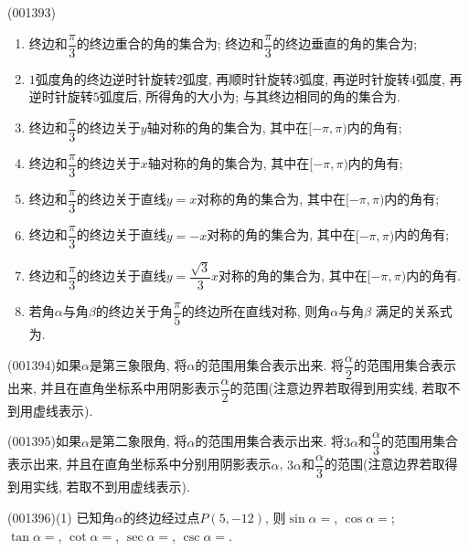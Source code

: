 \item (001393)\begin{enumerate}[(1)]
\item 终边和$\dfrac{\pi}{3}$的终边重合的角的集合为; 终边和$\dfrac{\pi}{3}$的终边垂直的角的集合为;\\ 
\item $1$弧度角的终边逆时针旋转$2$弧度, 再顺时针旋转$3$弧度, 再逆时针旋转$4$弧度, 再逆时针旋转$5$弧度后, 所得角的大小为; 与其终边相同的角的集合为.\\ 
\item 终边和$\dfrac{\pi}{3}$的终边关于$y$轴对称的角的集合为, 其中在$[-\pi,\pi)$内的角有;\\ 
\item 终边和$\dfrac{\pi}{3}$的终边关于$x$轴对称的角的集合为, 其中在$[-\pi,\pi)$内的角有;\\ 
\item 终边和$\dfrac{\pi}{3}$的终边关于直线$y=x$对称的角的集合为, 其中在$[-\pi,\pi)$内的角有;\\ 
\item 终边和$\dfrac{\pi}{3}$的终边关于直线$y=-x$对称的角的集合为, 其中在$[-\pi,\pi)$内的角有;\\ 
\item 终边和$\dfrac{\pi}{3}$的终边关于直线$y=\dfrac{\sqrt{3}}{3}x$对称的角的集合为, 其中在$[-\pi,\pi)$内的角有.\\ 
\item 若角$\alpha$与角$\beta$的终边关于角$\dfrac{\pi}{5}$的终边所在直线对称, 则角$\alpha$与角$\beta$ 满足的关系式为.\\ 
\end{enumerate}
\item (001394)如果$\alpha$是第三象限角, 将$\alpha$的范围用集合表示出来. 将$\dfrac{\alpha}{2}$的范围用集合表示出来, 并且在直角坐标系中用阴影表示$\dfrac{\alpha}{2}$的范围(注意边界若取得到用实线, 若取不到用虚线表示).
\item (001395)如果$\alpha$是第二象限角, 将$\alpha$的范围用集合表示出来. 将$3\alpha$和$\dfrac{\alpha}{3}$的范围用集合表示出来, 并且在直角坐标系中分别用阴影表示$\alpha$, $3\alpha$和$\dfrac{\alpha}{3}$的范围(注意边界若取得到用实线, 若取不到用虚线表示).
\item (001396)(1) 已知角$\alpha$的终边经过点$P(5,-12)$, 则$\sin\alpha=$, $\cos\alpha=$;\\
$\tan\alpha=$, $\cot\alpha=$, $\sec\alpha=$, $\csc\alpha=$.\\ 
